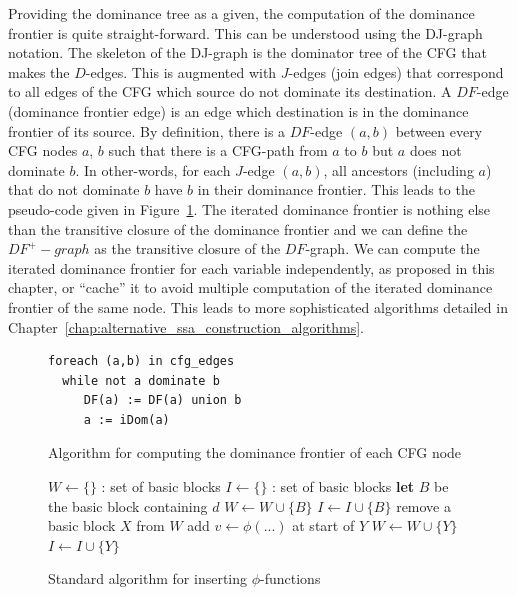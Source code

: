 Providing the dominance tree as a given, the computation of the dominance frontier is quite straight-forward. This can be understood using the DJ-graph notation. The skeleton of the DJ-graph is the dominator tree of the CFG that makes the $D$-edges. This is augmented with $J$-edges (join edges) that correspond to all edges of the CFG which source do not dominate its destination. A $DF$-edge (dominance frontier edge) is an edge which destination is in the dominance frontier of its source. By definition, there is a $DF$-edge $(a,b)$ between every CFG nodes $a$, $b$ such that there is a CFG-path from $a$ to $b$ but $a$ does not dominate $b$. 
In other-words, for each  $J$-edge $(a,b)$, all ancestors (including $a$) that do not dominate $b$ have $b$ in their dominance frontier. This leads to the pseudo-code given in Figure~\ref{fig:classical_construction:df}. The iterated dominance frontier is nothing else than the transitive closure of the dominance frontier and we can define the $DF^+-graph$ as the transitive closure of the $DF$-graph. We can compute the iterated dominance frontier for each variable independently, as proposed in this chapter, or ``cache'' it to avoid multiple computation of the iterated dominance frontier of the same node. This leads to more sophisticated algorithms detailed in Chapter~\ref{chap:alternative_ssa_construction_algorithms}.

\begin{figure}
\begin{verbatim}
foreach (a,b) in cfg_edges
  while not a dominate b
     DF(a) := DF(a) union b
     a := iDom(a)
\end{verbatim}
\caption{\label{fig:classical_construction:df}Algorithm for computing the dominance frontier of each CFG node}
\end{figure}

\begin{figure}

\begin{algorithmic}[1]
\STATE $W \leftarrow \{ \}$ : set of basic blocks
\STATE $I \leftarrow \{ \}$ : set of basic blocks
    \STATE \textbf{let} $B$ be the basic block containing $d$
    \STATE $W \leftarrow W \cup \{ B \}$
    \STATE $I \leftarrow I \cup \{ B \}$
  \ENDFOR
    \STATE remove a basic block $X$ from $W$
        \STATE add $v \leftarrow \phi(...)$ at start of $Y$
          \STATE $W \leftarrow W \cup \{ Y \}$
          \STATE $I \leftarrow I \cup \{ Y \}$
        \ENDIF
      \ENDIF
    \ENDFOR
  \ENDWHILE
\ENDFOR
\end{algorithmic}
\caption{\label{fig:classical_construction:phi_insertion}Standard algorithm for inserting $\phi$-functions}
\end{figure}


